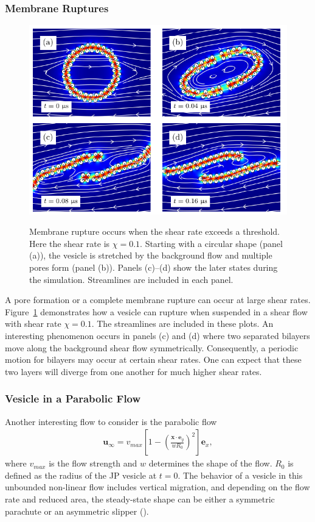 \documentclass[lineno]{jfm}
\newcommand{\xx}{\mathbf{x}}
\newcommand{\uu}{\mathbf{u}}
\begin{document}
\subsubsection{Membrane Ruptures}
\begin{figure}
\centering
\includegraphics[width=11.32cm]{Figure8_Wrapper.pdf}
\\
  \caption{\label{figure8} Membrane rupture occurs when the shear rate
  exceeds a threshold. Here the shear rate is $\chi = 0.1$. Starting
  with a circular shape (panel (a)), the vesicle is stretched by the
  background flow and multiple pores form (panel (b)). Panels (c)--(d)
  show the later states during the simulation. Streamlines are included
  in each panel.}
\end{figure}
A pore formation or a complete membrane rupture can occur at large shear
rates. Figure~\ref{figure8} demonstrates how a vesicle can rupture when
suspended in a shear flow with shear rate $\chi=0.1$. The streamlines
are included in these plots. An interesting phenomenon occurs in panels
(c) and (d) where two separated bilayers move along the background shear
flow symmetrically. Consequently, a periodic motion for bilayers may
occur at certain shear rates. One can expect that these two layers will
diverge from one another for much higher shear rates.



\subsubsection{Vesicle in a Parabolic Flow}
Another interesting flow to consider is the parabolic flow
\begin{align}
  \uu_\infty = v_{max}\left[ 1 - \left( 
    \frac{\xx \cdot \mathbf{e}_y}{wR_0}\right)^2
    \right]\mathbf{e}_x,
\end{align}
%
where $v_{max}$ is the flow strength and $w$ determines the shape of the
flow. $R_0$ is defined as the radius of the JP vesicle at $t=0$. The
behavior of a vesicle in this unbounded non-linear flow includes
vertical migration, and depending on the flow rate and reduced area, the
steady-state shape can be either a symmetric parachute or an asymmetric
slipper (\cite{Kaoui09, cou-kao-pod-mis2008, dan-vla-mis2009}).
\end{document}
